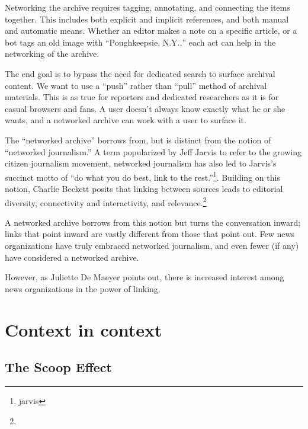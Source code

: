 Networking the archive requires tagging, annotating, and connecting the items together. This includes both explicit and implicit references, and both manual and automatic means. Whether an editor makes a note on a specific article, or a bot tags an old image with ``Poughkeepsie, N.Y.,'' each act can help in the networking of the archive.

The end goal is to bypass the need for dedicated search to surface archival content. We want to use a ``push'' rather than ``pull'' method of archival materials. This is as true for reporters and dedicated researchers as it is for casual browsers and fans. A user doesn't always know exactly what he or she wants, and a networked archive can work with a user to surface it.

The ``networked archive'' borrows from, but is distinct from the notion of ``networked journalism.'' A term popularized by Jeff Jarvis to refer to the growing citizen journalism movement, networked journalism has also led to Jarvis's succinct motto of ``do what you do best, link to the rest.''\footnote{jarvis}. Building on this notion, Charlie Beckett posits that linking between sources leads to editorial diversity, connectivity and interactivity, and relevance.\footnote{}

A networked archive borrows from this notion but turns the conversation inward; links that point inward are vastly different from those that point out. Few news organizations have truly embraced networked journalism, and even fewer (if any) have considered a networked archive.

However, as Juliette De Maeyer points out, there is increased interest among news organizations in the power of linking.

\section{Context in context}

\subsection{The Scoop Effect} %


